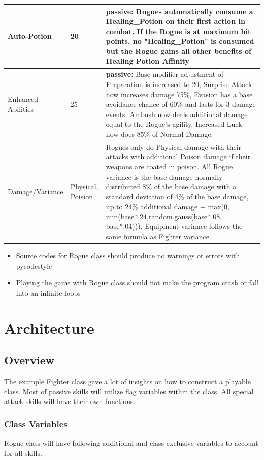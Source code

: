 \documentclass[12pt]{article} %
\begin{document}
\begin{footnotesize}
\begin{center}
\begin{tabular}{ | m{3cm} | m{1.5cm} | m{10cm} | }
\hline
Auto-Potion & 20 & \textbf{passive:} Rogues automatically consume a Healing\_Potion on their first action in combat. If the Rogue is at maximum hit points, no "Healing\_Potion" is consumed but the Rogue gains all other benefits of Healing Potion Affinity \\
\hline
Enhanced Abilities & 25 & \textbf{passive:} Base modifier adjustment of Preparation is increased to 20, Surprise Attack now increases damage 75\%, Evasion has a base avoidance chance of 60\% and lasts for 3 damage events. Ambush now deals additional damage equal to the Rogue’s agility, Increased Luck now does 85\% of Normal Damage.\\
\hline
Damage/Variance & Physical, Poision & Rogues only do Physical damage with their attacks with additional Poison damage if their weapons are coated in poison. All Rogue variance is the base damage normally distributed 8\% of the base damage with a standard deviation of 4\% of the base damage, up to 24\% additional damage + max(0, min(base*.24,random.gauss(base*.08, base*.04))). Equipment variance follows the same formula as Fighter variance. \\
\hline
\end{tabular}
\end{center}
\end{footnotesize}

\begin{itemize}
    \item Source codes for Rogue class should produce no warnings or errors with pycodestyle
    \item Playing the game with Rogue class should not make the program crash or fall into an infinite loops
\end{itemize}

\section{Architecture}

\subsection{Overview}

The example Fighter class gave a lot of insights on how to construct a playable class. Most of passive skills will utilize flag variables within the class. All special attack skills will have their own functions.

\subsubsection{Class Variables}
Rogue class will have following additional and class exclusive variables to account for all skills.
\end{document}
